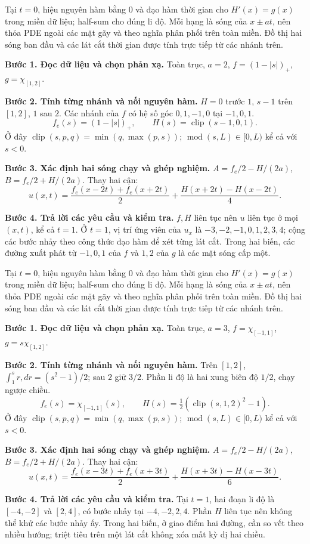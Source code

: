 Tại $t=0$, hiệu nguyên hàm bằng $0$ và đạo hàm thời gian cho $H'(x)=g(x)$ trong miền dữ liệu; half-sum cho đúng li độ. Mỗi hạng là sóng của $x\pm at$, nên thỏa PDE ngoài các mặt gãy và theo nghĩa phân phối trên toàn miền. Đồ thị hai sóng ban đầu và các lát cắt thời gian được tính trực tiếp từ các nhánh trên.

\textbf{Bước 1. Đọc dữ liệu và chọn phản xạ.} Toàn trục, $a=2$, $f=(1-|s|)_+$, $g=\chi_{[1,2]}$.

\textbf{Bước 2. Tính từng nhánh và nối nguyên hàm.} $H=0$ trước $1$, $s-1$ trên $[1,2]$, $1$ sau $2$. Các nhánh của $f$ có hệ số góc $0,1,-1,0$ tại $-1,0,1$.
\[f_e(s)=(1-|s|)_+,\qquad H(s)=\operatorname{clip}(s-1,0,1).\]
Ở đây $\operatorname{clip}(s,p,q)=\min(q,\max(p,s))$; $\operatorname{mod}(s,L)\in[0,L)$ kể cả với $s<0$.

\textbf{Bước 3. Xác định hai sóng chạy và ghép nghiệm.} $A=f_e/2-H/(2a)$, $B=f_e/2+H/(2a)$. Thay hai cận:
\[u(x,t)=\frac{f_e(x-2t)+f_e(x+2t)}2+\frac{H(x+2t)-H(x-2t)}{4}.\]

\textbf{Bước 4. Trả lời các yêu cầu và kiểm tra.} $f,H$ liên tục nên $u$ liên tục ở mọi $(x,t)$, kể cả $t=1$. Ở $t=1$, vị trí ứng viên của $u_x$ là $-3,-2,-1,0,1,2,3,4$; cộng các bước nhảy theo công thức đạo hàm để xét từng lát cắt. Trong hai biến, các đường xuất phát từ $-1,0,1$ của $f$ và $1,2$ của $g$ là các mặt sóng cấp một.

Tại $t=0$, hiệu nguyên hàm bằng $0$ và đạo hàm thời gian cho $H'(x)=g(x)$ trong miền dữ liệu; half-sum cho đúng li độ. Mỗi hạng là sóng của $x\pm at$, nên thỏa PDE ngoài các mặt gãy và theo nghĩa phân phối trên toàn miền. Đồ thị hai sóng ban đầu và các lát cắt thời gian được tính trực tiếp từ các nhánh trên.

\textbf{Bước 1. Đọc dữ liệu và chọn phản xạ.} Toàn trục, $a=3$, $f=\chi_{[-1,1]}$, $g=s\chi_{[1,2]}$.

\textbf{Bước 2. Tính từng nhánh và nối nguyên hàm.} Trên $[1,2]$, $\int_1^s r,dr=(s^2-1)/2$; sau $2$ giữ $3/2$. Phần li độ là hai xung biên độ $1/2$, chạy ngược chiều.
\[f_e(s)=\chi_{[-1,1]}(s),\qquad H(s)=\tfrac12(\operatorname{clip}(s,1,2)^2-1).\]
Ở đây $\operatorname{clip}(s,p,q)=\min(q,\max(p,s))$; $\operatorname{mod}(s,L)\in[0,L)$ kể cả với $s<0$.

\textbf{Bước 3. Xác định hai sóng chạy và ghép nghiệm.} $A=f_e/2-H/(2a)$, $B=f_e/2+H/(2a)$. Thay hai cận:
\[u(x,t)=\frac{f_e(x-3t)+f_e(x+3t)}2+\frac{H(x+3t)-H(x-3t)}{6}.\]

\textbf{Bước 4. Trả lời các yêu cầu và kiểm tra.} Tại $t=1$, hai đoạn li độ là $[-4,-2]$ và $[2,4]$, có bước nhảy tại $-4,-2,2,4$. Phần $H$ liên tục nên không thể khử các bước nhảy ấy. Trong hai biến, ở giao điểm hai đường, cần so vết theo nhiều hướng; triệt tiêu trên một lát cắt không xóa mất kỳ dị hai chiều.

